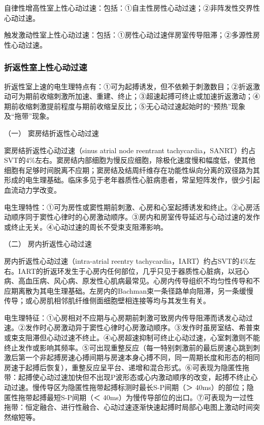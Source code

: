 自律性增高性室上性心动过速：包括：①自主性房性心动过速；②非阵发性交界性心动过速。

触发激动性室上性心动过速：包括：①房性心动过速伴房室传导阻滞；②多源性房性心动过速。

\subsubsection{折返性室上性心动过速}

折返性室上速的电生理特点有：①可为起搏诱发，但不依赖于刺激数目；②折返激动可为期前收缩刺激所加速、重建、终止；③超速起搏可终止或加速折返激动；④期前收缩刺激提前程度与期前收缩呈反比；⑤无心动过速起始时的“预热”现象及“拖带”现象。

\hypertarget{text00289.htmlux5cux23CHP10-2-2-1-1-1}{}
（一） 窦房结折返性心动过速

窦房结折返性心动过速（sinus atrial node reentrant
tachycardia，SANRT）约占SVT的4\%左右。窦房结内部细胞为慢反应细胞，除极化速度慢和幅度低，使其他细胞有足够时间脱离不应期；窦房结及结周纤维存在功能性纵向分离的双径路为其形成的电生理基础。临床多见于老年器质性心脏病患者，常呈短阵发作，很少引起血流动力学改变。

电生理特性：①可为房性或窦性期前刺激、心房和心室起搏诱发和终止。②心房活动顺序同于窦性心律时的心房激动顺序。③房内和房室传导延迟与心动过速的发作或终止无关。④心动过速的周长不受束支阻滞影响。

\hypertarget{text00289.htmlux5cux23CHP10-2-2-1-1-2}{}
（二） 房内折返性心动过速

房内折返性心动过速（intra-atrial reentry
tachycardia，IART）约占SVT的4\%左右。IART的折返环发生于心房内任何部位，几乎只见于器质性心脏病，以冠心病、高血压病、风心病、原发性心肌病最常见。心房内传导组织不均匀性传导和不应期离散为其电生理基础。左房内的Bachman束一条径路单向阻滞，另一条缓慢传导；或心房肌相邻肌纤维侧面细胞壁相连接等均与其发生有关。

电生理特征：①心房相对不应期与心房期前刺激可致房内传导阻滞而诱发心动过速。②发作时心房激动异于窦性心律时心房激动顺序。③发作时虽房室结、希普束或束支阻滞但心动过速不终止。④心房超速抑制可终止心动过速，心室刺激则不能终止发作或影响其频率。⑤可出现重整反应（每一特别刺激前的最后房速心跳到刺激后第一个非起搏房速心搏间期与房速本身心搏不同，同一周期长度和形态的相同房速于起搏后恢复），重整反应呈平台、递增和混合形式。⑥可表现为隐匿性拖带：起搏使心动过速加快但不出现P波形态或心内激动顺序的改变，起搏不终止心动过速。慢传导区为隐匿性拖带起搏标测时最长S-P间期（＞
40ms）的部位；隐匿性拖带起搏最短S-P间期（＜
40ms）为慢传导部位的出口。⑦可表现为一过性拖带：恒定融合、进行性融合、心动过速逐渐快速起搏时局部心电图上激动时间突然缩短等。

